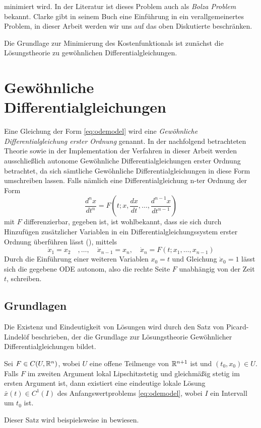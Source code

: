 minimiert wird. 
In der Literatur ist dieses Problem auch als \textit{Bolza Problem} bekannt. Clarke gibt in seinem Buch \cite[S. 165 ff]{clarke1990optimization} eine Einführung in ein verallgemeinertes Problem, in dieser Arbeit werden wir uns auf das oben Diskutierte beschränken.

Die Grundlage zur Minimierung des Kostenfunktionals ist zunächst die Lösungstheorie zu gewöhnlichen Differentialgleichungen.

\section{Gewöhnliche Differentialgleichungen}
Eine Gleichung der Form \eqref{eq:odemodel} wird eine \textit{Gewöhnliche Differentialgleichung erster Ordnung} genannt. 
In der nachfolgend betrachteten Theorie sowie in der Implementation der Verfahren in dieser Arbeit werden ausschließlich autonome Gewöhnliche Differentialgleichungen erster Ordnung betrachtet, da sich sämtliche Gewöhnliche Differentialgleichungen in diese Form umschreiben lassen.
Falls nämlich eine Differentialgleichung n-ter Ordnung der Form 
\[
 \frac{d^n x}{dt^n}= F\left(t;x,\frac{dx}{dt},\ldots,\frac{d^{n-1} x}{dt^{n-1}}\right)
\]
mit $F$ differenzierbar, gegeben ist, ist wohlbekannt, dass sie sich durch Hinzufügen zusätzlicher Variablen in ein Differentialgleichungssystem erster Ordnung überführen lässt (\cite[S. 105]{arnold2001grundbegriffe}), mittels
\[
 \dot x_1 = x_2 \quad ,\ldots,\quad \dot x_{n-1} = x_n, \quad  \dot x_n = F(t;x_1,\ldots,x_{n-1})
\]
Durch die Einführung einer weiteren Variablen $x_0 = t$ und Gleichung $\dot x_0=1$ lässt sich die gegebene ODE autonom, also die rechte Seite $F$ unabhängig von der Zeit $t$, schreiben.
\subsection{Grundlagen}
Die Existenz und Eindeutigkeit von Lösungen wird durch den Satz von Picard-Lindelöf beschrieben, der die Grundlage zur Lösungstheorie Gewöhnlicher Differentialgleichungen bildet.
\begin{theorem}
\label{thm:picard-lindeloeff}
 Sei $F\in C(U,\mathbb{R}^n)$, wobei $U$ eine offene Teilmenge von $\mathbb{R}^{n+1}$ ist und $(t_0,x_0)\in U$. Falls $F$ im zweiten Argument lokal Lipschitzstetig und gleichmäßig stetig im ersten Argument ist, dann existiert eine eindeutige lokale Lösung $\bar x(t)\in C^1(I)$ des Anfangswertproblems \eqref{eq:odemodel}, wobei $I$ ein Intervall um $t_0$ ist.
\end{theorem}
 Dieser Satz wird beispielsweise in \cite{teschl2012ordinary} bewiesen. 
% 

